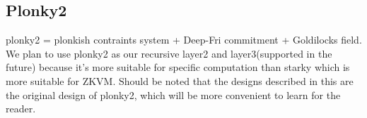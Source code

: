 \subsection{Plonky2} \label{sec:Plonky2}

plonky2 = plonkish contraints system + Deep-Fri commitment + Goldilocks field. We plan to use plonky2 as our recursive layer2 and layer3(supported in the future) because it's more suitable
for specific computation than starky which is more suitable for ZKVM. Should be noted that the designs described in this are the original design of plonky2, which will be more convenient to learn for
the reader.






